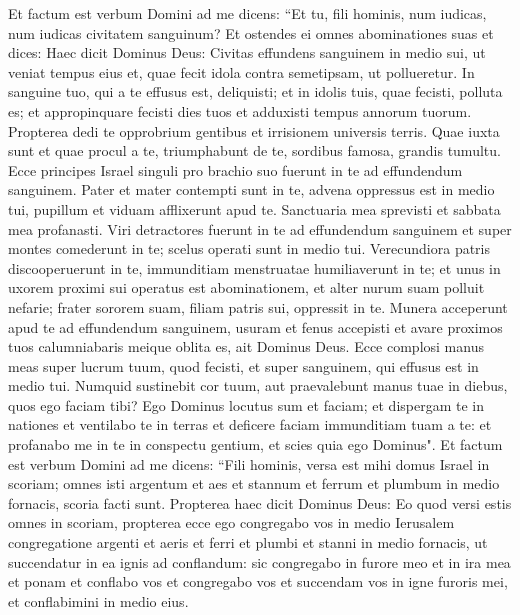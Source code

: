 \begin{biblechapter}  
\verse Et factum est verbum Domini ad me dicens: 
\verse “Et tu, fili hominis, num iudicas, num iudicas civitatem sanguinum? 
\verse Et ostendes ei omnes abominationes suas et dices: Haec dicit Dominus Deus: Civitas effundens sanguinem in medio sui, ut veniat tempus eius et, quae fecit idola contra semetipsam, ut pollueretur. 
\verse In sanguine tuo, qui a te effusus est, deliquisti; et in idolis tuis, quae fecisti, polluta es; et appropinquare fecisti dies tuos et adduxisti tempus annorum tuorum. Propterea dedi te opprobrium gentibus et irrisionem universis terris. 
\verse Quae iuxta sunt et quae procul a te, triumphabunt de te, sordibus famosa, grandis tumultu. 
\verse Ecce principes Israel singuli pro brachio suo fuerunt in te ad effundendum sanguinem. 
\verse Pater et mater contempti sunt in te, advena oppressus est in medio tui, pupillum et viduam afflixerunt apud te. 
\verse Sanctuaria mea sprevisti et sabbata mea profanasti. 
\verse Viri detractores fuerunt in te ad effundendum sanguinem et super montes comederunt in te; scelus operati sunt in medio tui. 
\verse Verecundiora patris discooperuerunt in te, immunditiam menstruatae humiliaverunt in te; 
\verse et unus in uxorem proximi sui operatus est abominationem, et alter nurum suam polluit nefarie; frater sororem suam, filiam patris sui, oppressit in te. 
\verse Munera acceperunt apud te ad effundendum sanguinem, usuram et fenus accepisti et avare proximos tuos calumniabaris meique oblita es, ait Dominus Deus. 
\verse Ecce complosi manus meas super lucrum tuum, quod fecisti, et super sanguinem, qui effusus est in medio tui. 
\verse Numquid sustinebit cor tuum, aut praevalebunt manus tuae in diebus, quos ego faciam tibi? Ego Dominus locutus sum et faciam; 
\verse et dispergam te in nationes et ventilabo te in terras et deficere faciam immunditiam tuam a te: 
\verse et profanabo me in te in conspectu gentium, et scies quia ego Dominus". 
\verse Et factum est verbum Domini ad me dicens: 
\verse “Fili hominis, versa est mihi domus Israel in scoriam; omnes isti argentum et aes et stannum et ferrum et plumbum in medio fornacis, scoria facti sunt. 
\verse Propterea haec dicit Dominus Deus: Eo quod versi estis omnes in scoriam, propterea ecce ego congregabo vos in medio Ierusalem 
\verse congregatione argenti et aeris et ferri et plumbi et stanni in medio fornacis, ut succendatur in ea ignis ad conflandum: sic congregabo in furore meo et in ira mea et ponam et conflabo vos 
\verse et congregabo vos et succendam vos in igne furoris mei, et conflabimini in medio eius. 

\end{biblechapter}
